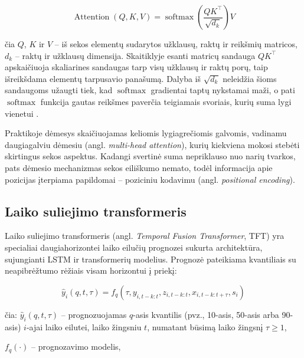 \begin{equation}
    \operatorname{Attention}(Q, K, V) = \operatorname{softmax}\left(\frac{Q K^\top}{\sqrt{d_k}}\right) V
    \label{eq:attention}
\end{equation}

čia $Q$, $K$ ir $V$ -- iš sekos elementų sudarytos užklausų, raktų ir reikšmių matricos, $d_k$ -- raktų ir užklausų dimensija.
Skaitiklyje esanti matricų sandauga $Q K^\top$ apskaičiuoja skaliarines sandaugas tarp visų užklausų ir raktų porų, taip išreikšdama elementų tarpusavio panašumą.
Dalyba iš $\sqrt{d_k}$ neleidžia šioms sandaugoms užaugti tiek, kad $\operatorname{softmax}$ gradientai taptų nykstamai maži, o pati $\operatorname{softmax}$ funkcija gautas reikšmes paverčia teigiamais svoriais, kurių suma lygi vienetui \cite{vaswani2017}.

Praktikoje dėmesys skaičiuojamas keliomis lygiagrečiomis galvomis, vadinamu daugiagalviu dėmesiu (angl. \textit{multi-head attention}), kurių kiekviena mokosi stebėti skirtingus sekos aspektus.
Kadangi svertinė suma nepriklauso nuo narių tvarkos, pats dėmesio mechanizmas sekos eiliškumo nemato, todėl informacija apie pozicijas įterpiama papildomai -- poziciniu kodavimu (angl. \textit{positional encoding}).


\subsection{Laiko suliejimo transformeris}

Laiko suliejimo transformeris (angl. \textit{Temporal Fusion Transformer}, TFT) \cite{lim2021} yra specialiai daugiahorizontei laiko eilučių prognozei sukurta architektūra, sujungianti LSTM ir transformerių modelius.
Prognozė pateikiama kvantiliais su neapibrėžtumo rėžiais visam horizontui į priekį:

\begin{equation}
    \hat{y}_i(q, t, \tau) = f_q \left( \tau, y_{i, t-k:t}, z_{i, t-k:t}, x_{i, t-k:t+\tau}, s_i \right)
\end{equation}

čia:
    $\hat{y}_i(q, t, \tau)$ -- prognozuojamas $q$-asis kvantilis (pvz., 10-asis, 50-asis arba 90-asis) $i$-ajai laiko eilutei, laiko žingsniu $t$, numatant būsimą laiko žingsnį $\tau \ge 1$,

    $f_q(\cdot)$ -- prognozavimo modelis,

